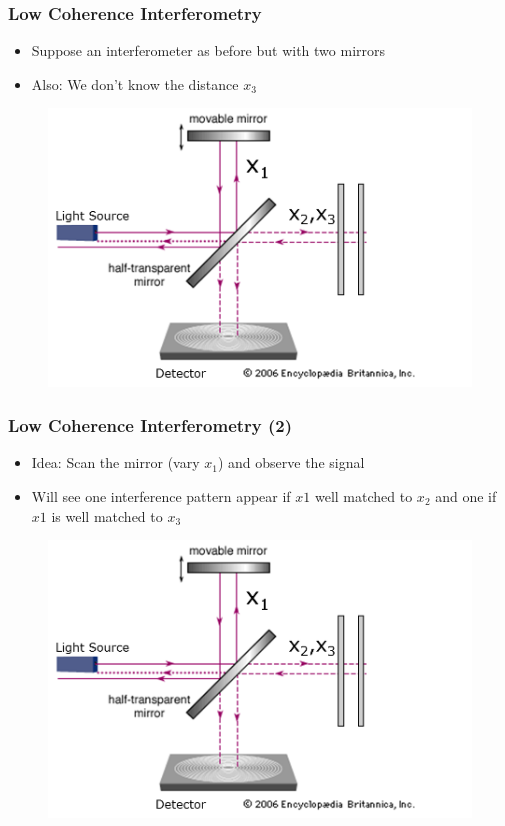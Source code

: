 \begin{frame}
    \frametitle{Low Coherence Interferometry}
    \begin{itemize}
        \item Suppose an interferometer as before but with two mirrors
        \item Also: We don't know the distance $x_3$
    \end{itemize}
    \begin{figure}
        \includegraphics[height=0.65\textheight]{figures/DoubleMirror.png}

    \end{figure}

\end{frame}



\begin{frame}
    \frametitle{Low Coherence Interferometry (2)}
    \begin{itemize}
        \item Idea: Scan the mirror (vary $x_1$) and observe the signal
        \item Will see one interference pattern appear if $x1$ well matched to $x_2$ and one if $x1$ is well matched to $x_3$
    \end{itemize}
    \begin{figure}
        \includegraphics[height=0.65\textheight]{figures/DoubleMirror.png}

    \end{figure}

\end{frame}


